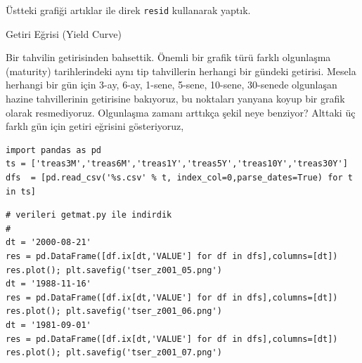 \documentclass[12pt,fleqn]{article}\usepackage{../../common}
\begin{document}
Üstteki grafiği artıklar ile direk \verb!resid! kullanarak yaptık. 

\newpage

Getiri Eğrisi (Yield Curve)

Bir tahvilin getirisinden bahsettik. Önemli bir grafik türü farklı olgunlaşma
(maturity) tarihlerindeki aynı tip tahvillerin herhangi bir gündeki
getirisi. Mesela herhangi bir gün için 3-ay, 6-ay, 1-sene, 5-sene, 10-sene,
30-senede olgunlaşan hazine tahvillerinin getirisine bakıyoruz, bu noktaları
yanyana koyup bir grafik olarak resmediyoruz. Olgunlaşma zamanı arttıkça şekil
neye benziyor? Alttaki üç farklı gün için getiri eğrisini gösteriyoruz,

\begin{verbatim}
import pandas as pd  
ts = ['treas3M','treas6M','treas1Y','treas5Y','treas10Y','treas30Y']
dfs  = [pd.read_csv('%s.csv' % t, index_col=0,parse_dates=True) for t in ts]
\end{verbatim}

\begin{verbatim}
# verileri getmat.py ile indirdik
#
dt = '2000-08-21'
res = pd.DataFrame([df.ix[dt,'VALUE'] for df in dfs],columns=[dt])
res.plot(); plt.savefig('tser_z001_05.png')
dt = '1988-11-16'
res = pd.DataFrame([df.ix[dt,'VALUE'] for df in dfs],columns=[dt])
res.plot(); plt.savefig('tser_z001_06.png')
dt = '1981-09-01'
res = pd.DataFrame([df.ix[dt,'VALUE'] for df in dfs],columns=[dt])
res.plot(); plt.savefig('tser_z001_07.png')
\end{verbatim}
\end{document}
